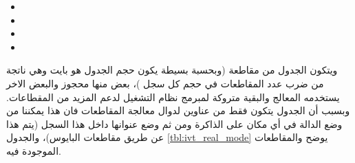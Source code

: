 \documentclass[document.tex]{subfiles}
\begin{document}
\begin{english}
\begin{itemize}
\item {}
\item {}
\item {}
\item {}
\end{itemize}
\end{english}

ويتكون الجدول من  مقاطعة (وبحسبة بسيطة يكون حجم الجدول هو  بايت وهي ناتجة من ضرب عدد المقاطعات في حجم كل سجل )، بعض منها محجوز والبعض الاخر يستخدمه المعالج والبقية متروكة لمبرمج نظام التشغيل لدعم المزيد من المقطاعات. وبسبب أن الجدول يتكون فقط من عناوين لدوال معالجة المقاطعات فان هذا يمكننا من وضع الدالة في أي مكان على الذاكرة ومن ثم وضع عنوانها داخل هذا السجل (يتم هذا عن طريق مقاطعات البايوس)، والجدول \ref{tbl:ivt_real_mode} يوضح  والمقاطعات الموجودة فيه.
\end{document}
